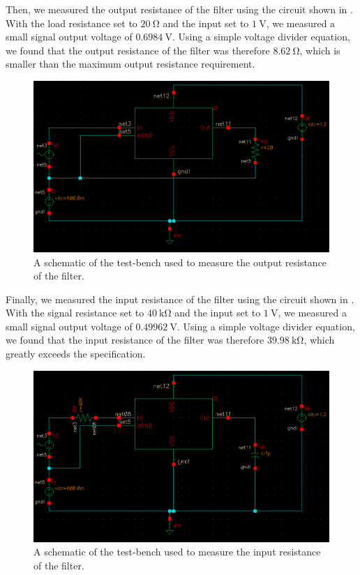 \documentclass[journal,hidelinks]{IEEEtran}
\begin{document}
Then, we measured the output resistance of the filter using the circuit shown in . With the load resistance set to $\SI{20}{\ohm}$ and the input set to $\SI{1}{\volt}$, we measured a small signal output voltage of $\SI{0.6984}{\volt}$. Using a simple voltage divider equation, we found that the output resistance of the filter was therefore $\SI{8.62}{\ohm}$, which is smaller than the maximum output resistance requirement.

\begin{figure}[!htb]
  \centering
  \includegraphics[width=\columnwidth]{schematics/filter_tb_2.png}
  \caption{A schematic of the test-bench used to measure the output resistance of the filter.}
  \label{fig:filter_tb_2}
\end{figure}

Finally, we measured the input resistance of the filter using the circuit shown in . With the signal resistance set to $\SI{40}{\kilo\ohm}$ and the input set to $\SI{1}{\volt}$, we measured a small signal output voltage of $\SI{0.49962}{\volt}$. Using a simple voltage divider equation, we found that the input resistance of the filter was therefore $\SI{39.98}{\kilo\ohm}$, which greatly exceeds the specification.

\begin{figure}[!htb]
  \centering
  \includegraphics[width=\columnwidth]{schematics/filter_tb_3.png}
  \caption{A schematic of the test-bench used to measure the input resistance of the filter.}
  \label{fig:filter_tb_3}
\end{figure}
\end{document}
